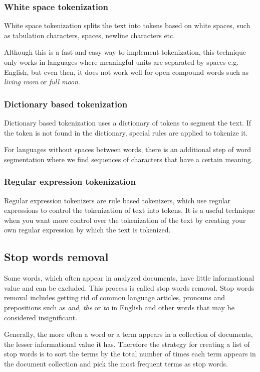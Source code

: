 \subsubsection{White space tokenization}
White space tokenization splits the text into tokens based on white spaces, such as tabulation characters, spaces, newline characters etc.

Although this is a fast and easy way to implement tokenization, this technique only works in languages where meaningful units are separated by spaces e.g.  English, but even then, it does not work well for open compound words such as \textit{living room} or \textit{full moon}. \cite{tokenization_mgl}
\subsubsection{Dictionary based tokenization}
Dictionary based tokenization uses a dictionary of tokens to segment the text. If the token is not found in the dictionary, special rules are applied to tokenize it. \cite{tokenization_twd}

For languages without spaces between words, there is an additional step of word segmentation where we find sequences of characters that have a certain meaning. \cite{tokenization_mgl}
\subsubsection{Regular expression tokenization}
Regular expression tokenizers are rule based tokenizers, which use regular expressions to control the tokenization of text into tokens. \cite{tokenization_twd}
It is a useful technique when you want more control over the tokenization of the text by creating your own regular expression by which the text is tokenized.
\subsection{Stop words removal}
Some words, which often appear in analyzed documents, have little informational value and can be excluded. This process is called stop words removal. Stop words removal includes getting rid of common language articles, pronouns and prepositions such as \textit{and}, \textit{the} or \textit{to} in English and other words that may be considered insignificant. \cite{nlp_tasks}

Generally, the more often a word or a term appears in a collection of documents, the lesser informational value it has. Therefore the strategy for creating a list of stop words is to sort the terms by the total number of times each term appears in the document collection and pick the most frequent terms as stop words. \cite{stopwords}

